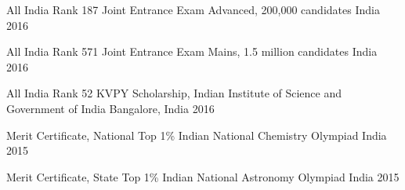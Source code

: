 
\begin{cvhonors}

  \cvhonor
    {All India Rank 187} %
    {Joint Entrance Exam Advanced, 200,000 candidates} %
    {India} %
    {2016} %

  \cvhonor
    {All India Rank 571} %
    {Joint Entrance Exam Mains, 1.5 million candidates} %
    {India} %
    {2016} %

  \cvhonor
    {All India Rank 52} %
    {KVPY Scholarship, Indian Institute of Science and Government of India} %
    {Bangalore, India} %
    {2016} %

  \cvhonor
    {Merit Certificate, National Top 1\%} %
    {Indian National Chemistry Olympiad} %
    {India} %
    {2015} %

  \cvhonor
    {Merit Certificate, State Top 1\%} %
    {Indian National Astronomy Olympiad} %
    {India} %
    {2015} %

\end{cvhonors}
